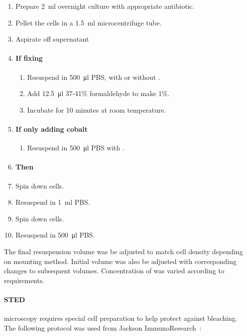 \documentclass[../main.tex]{subfiles}
\begin{document}
\begin{enumerate}
\item Prepare \SI{2}{\milli\litre} overnight culture with appropriate antibiotic.
\item Pellet the cells in a \SI{1.5}{\milli\litre} microcentrifuge tube.
\item Aspirate off supernatant
\item \paragraph{If fixing}
\begin{enumerate}
\item Resuspend in \SI{500}{\micro\litre} PBS, with or without .
\item Add \SI{12.5}{\micro\litre} 37-41\% formaldehyde to make 1\%.
\item Incubate for 10 minutes at room temperature.
\end{enumerate}
\item \paragraph{If only adding cobalt}
\begin{enumerate}
\item Resuspend in \SI{500}{\micro\litre} PBS with .
\end{enumerate}
\item[] \paragraph{Then}
\item Spin down cells.
\item Resuspend in \SI{1}{\milli\litre} PBS.
\item Spin down cells.
\item Resuspend in \SI{500}{\micro\litre} PBS.
\end{enumerate}

The final resuspension volume was be adjusted to match cell density depending on mounting method. Initial volume was also be adjusted with corresponding changes to subsequent volumes. Concentration of  was varied according to requirements.

\paragraph{STED} microscopy requires special cell preparation to help protect against bleaching. The following protocol was used from Jackson ImmunoResearch~\citep{jackson}:
\end{document}

